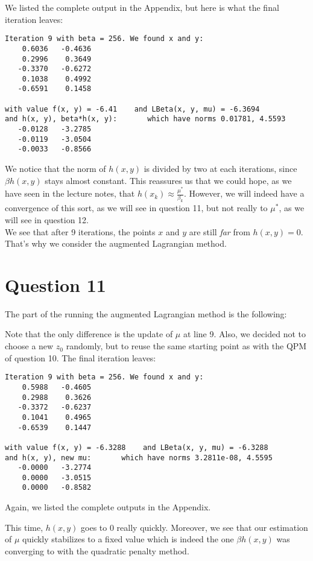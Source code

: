 \documentclass{article}
\begin{document}
We listed the complete output in the Appendix, but here is what the final iteration leaves:
\begin{lstlisting}
Iteration 9 with beta = 256. We found x and y:
    0.6036   -0.4636
    0.2996    0.3649
   -0.3370   -0.6272
    0.1038    0.4992
   -0.6591    0.1458

with value f(x, y) = -6.41    and LBeta(x, y, mu) = -6.3694
and h(x, y), beta*h(x, y):       which have norms 0.01781, 4.5593
   -0.0128   -3.2785
   -0.0119   -3.0504
   -0.0033   -0.8566
\end{lstlisting}

We notice that the norm of $h(x, y)$ is divided by two at each iterations, since $\beta h(x, y)$ stays almost constant.
This reassures us that we could hope, as we have seen in the lecture notes, that $h(x_k) \approx \frac{\mu^*}{\beta_k}$. However, we will indeed have a convergence of this sort, as we will see in question 11, but not really to $\mu^*$, as we will see in question 12.\\
We see that after 9 iterations, the points $x$ and $y$ are still \textit{far} from $h(x, y) = 0$. That's why we consider the augmented Lagrangian method.


\section*{Question 11}
The part of the  running the augmented Lagrangian method is the following:


Note that the only difference is the update of $\mu$ at line 9. Also, we decided not to choose a new $z_0$ randomly, but to reuse the same starting point as with the QPM of question 10.
The final iteration leaves:
\begin{lstlisting}
Iteration 9 with beta = 256. We found x and y:
    0.5988   -0.4605
    0.2988    0.3626
   -0.3372   -0.6237
    0.1041    0.4965
   -0.6539    0.1447

with value f(x, y) = -6.3288    and LBeta(x, y, mu) = -6.3288
and h(x, y), new mu:       which have norms 3.2811e-08, 4.5595
   -0.0000   -3.2774
    0.0000   -3.0515
    0.0000   -0.8582
\end{lstlisting}
Again, we listed the complete outputs in the Appendix.

This time, $h(x, y)$ goes to 0 really quickly. Moreover, we see that our estimation of $\mu$ quickly stabilizes to a fixed value which is indeed the one $\beta h(x, y)$ was converging to with the quadratic penalty method.
\end{document}
